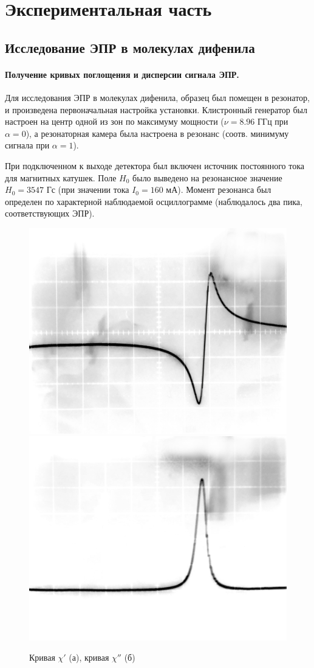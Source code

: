 \section{Экспериментальная часть}%


\subsection{Исследование ЭПР в молекулах дифенила}%
\paragraph{Получение кривых поглощения и дисперсии сигнала ЭПР.}%
\label{par:1}
Для исследования ЭПР в молекулах дифенила, образец был помещен в резонатор, и произведена первоначальная настройка
установки. Клистронный генератор был настроен на центр одной из зон по максимуму мощности ($\nu = 8.96$ ГГц при $\alpha = 0$), а
резонаторная камера была настроена в резонанс (соотв. минимуму сигнала при $\alpha = 1$).

При подключенном к выходе детектора был включен источник постоянного тока для магнитных катушек. Поле $H_0$ было выведено на
резонансное значение $H_0 = 3547$ Гс (при значении тока $I_0 = 160$ мА). Момент резонанса был определен по характерной
наблюдаемой осциллограмме (наблюдалось два пика, соответствующих ЭПР).
\begin{figure}[h!]
    \centering
    \includegraphics[width=0.4\linewidth]{fig/fig22}
    \includegraphics[width=0.4\linewidth]{fig/fig33}
    \caption{Кривая $\chi'$ (а), кривая $\chi''$ (б)}
    \label{fig:2}
\end{figure}

